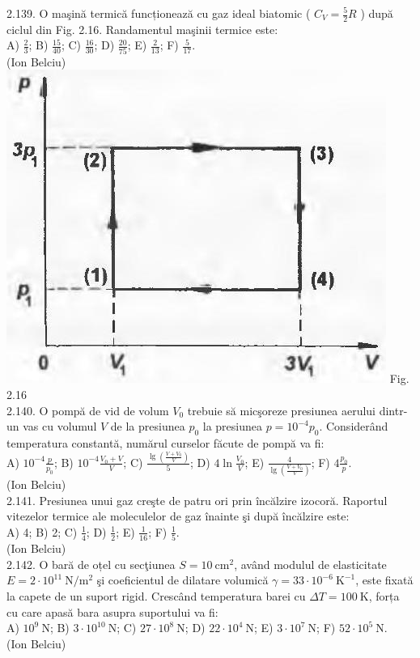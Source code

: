 2.139. O maşină termică funcționează cu gaz ideal biatomic ( $C_{V}=\frac{5}{2} R$ ) după ciclul din Fig. 2.16. Randamentul maşinii termice este:\\ A) $\frac{2}{3}$; B) $\frac{15}{40}$; C) $\frac{16}{30}$; D) $\frac{20}{75}$; E) $\frac{2}{13}$; F) $\frac{5}{17}$.\\ (Ion Belciu)\\ \includegraphics[width=0.4\linewidth]{images/2025_07_01_5b3ff9fa0d508c8e9f17g-104} Fig. 2.16\\

2.140. O pompă de vid de volum $V_{0}$ trebuie să micşoreze presiunea aerului dintr-un vas cu volumul $V$ de la presiunea $p_{0}$ la presiunea $p=10^{-4} p_{0}$. Considerând temperatura constantă, numărul curselor făcute de pompă va fi:\\ A) $10^{-4} \frac{p}{p_{0}}$; B) $10^{-4} \frac{V_{0}+V}{V}$; C) $\frac{\lg \left(\frac{V+V_{0}}{V}\right)}{5}$; D) $4 \ln \frac{V_{0}}{V}$; E) $\frac{4}{\lg \left(\frac{V+V_{0}}{V}\right)}$; F) $4 \frac{p_{0}}{p}$.\\ (Ion Belciu)\\

2.141. Presiunea unui gaz creşte de patru ori prin încălzire izocoră. Raportul vitezelor termice ale moleculelor de gaz înainte şi după încălzire este:\\ A) 4; B) 2; C) $\frac{1}{4}$; D) $\frac{1}{2}$; E) $\frac{1}{16}$; F) $\frac{1}{5}$.\\ (Ion Belciu)\\

2.142. O bară de oțel cu secţiunea $S=10 \mathrm{~cm}^{2}$, având modulul de elasticitate $E=2 \cdot 10^{11} \mathrm{~N} / \mathrm{m}^{2}$ şi coeficientul de dilatare volumică $\gamma=33 \cdot 10^{-6} \mathrm{~K}^{-1}$, este fixată la capete de un suport rigid. Crescând temperatura barei cu $\Delta T=100 \mathrm{~K}$, forța cu care apasă bara asupra suportului va fi:\\ A) $10^{9} \mathrm{~N}$; B) $3 \cdot 10^{10} \mathrm{~N}$; C) $27 \cdot 10^{8} \mathrm{~N}$; D) $22 \cdot 10^{4} \mathrm{~N}$; E) $3 \cdot 10^{7} \mathrm{~N}$; F) $52 \cdot 10^{5} \mathrm{~N}$.\\ (Ion Belciu)\\


